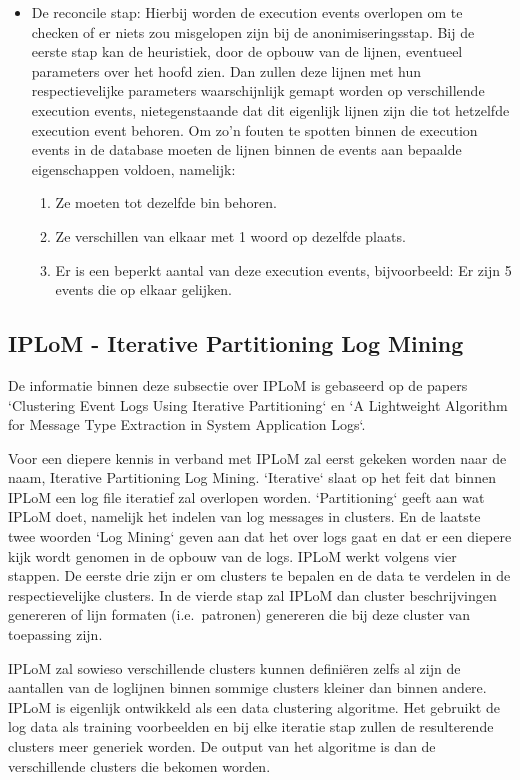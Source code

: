 \begin{itemize}
    \item De reconcile stap: Hierbij worden de execution events overlopen om te checken of er niets zou misgelopen zijn bij de anonimiseringsstap. Bij de eerste stap kan de heuristiek, door de opbouw van de lijnen, eventueel parameters over het hoofd zien. Dan zullen deze lijnen met hun respectievelijke parameters waarschijnlijk gemapt worden op verschillende execution events, nietegenstaande dat dit eigenlijk lijnen zijn die tot hetzelfde execution event behoren. Om zo'n fouten te spotten binnen de execution events in de database moeten de lijnen binnen de events aan bepaalde eigenschappen voldoen, namelijk:
    \begin{enumerate}
        \item Ze moeten tot dezelfde bin behoren.
        \item Ze verschillen van elkaar met 1 woord op dezelfde plaats.
        \item Er is een beperkt aantal van deze execution events, bijvoorbeeld: Er zijn 5 events die op elkaar gelijken.
    \end{enumerate}
\end{itemize}

\subsection{IPLoM - Iterative Partitioning Log Mining}
De informatie binnen deze subsectie over IPLoM is gebaseerd op de papers `Clustering Event Logs Using Iterative Partitioning` \autocite{makanju2009clustering} en `A Lightweight Algorithm for Message Type Extraction in System Application Logs`\autocite{5936060}.

Voor een diepere kennis in verband met IPLoM zal eerst gekeken worden naar de naam, Iterative Partitioning Log Mining. `Iterative` slaat op het feit dat binnen IPLoM een log file iteratief zal overlopen worden. `Partitioning` geeft aan wat IPLoM doet, namelijk het indelen van log messages in clusters. En de laatste twee woorden `Log Mining` geven aan dat het over logs gaat en dat er een diepere kijk wordt genomen in de opbouw van de logs. IPLoM werkt volgens vier stappen. De eerste drie zijn er om clusters te bepalen en de data te verdelen in de respectievelijke clusters. In de vierde stap zal IPLoM dan cluster beschrijvingen genereren of lijn formaten (i.e.\ patronen) genereren die bij deze cluster van toepassing zijn. 

IPLoM zal sowieso verschillende clusters kunnen definiëren zelfs al zijn de aantallen van de loglijnen binnen sommige clusters kleiner dan binnen andere. IPLoM is eigenlijk ontwikkeld als een data clustering algoritme. Het gebruikt de log data als training voorbeelden en bij elke iteratie stap zullen de resulterende clusters meer generiek worden. De output van het algoritme is dan de verschillende clusters die bekomen worden. 

